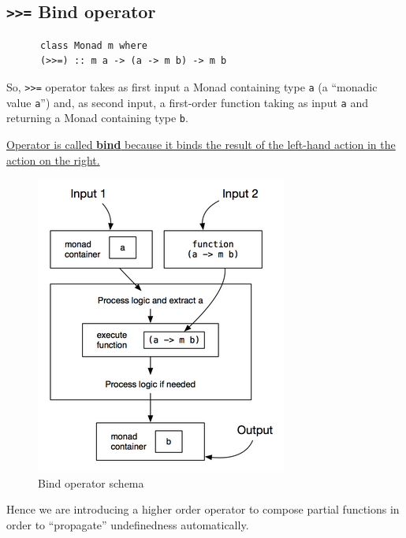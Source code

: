
\newpage
\subsection{\texttt{>>=} Bind operator}

\begin{paracol}{2}
   \colfill
   \begin{lstlisting}
      class Monad m where
      (>>=) :: m a -> (a -> m b) -> m b
   \end{lstlisting}
   
   So, \lstinline|>>=| operator takes as first input a Monad containing type \lstinline|a| (a ``monadic value \lstinline|a|'') and, as second input, a first-order function taking as input \lstinline|a| and returning a Monad containing type \lstinline|b|.

   \ul{Operator is called \textbf{bind} because it binds the result
   of the left-hand action in the action on the right.}
   \colfill

   \switchcolumn
   \begin{figure}[htbp]
      \centering
      \includegraphics{images/monads_bind.png}
      \caption{Bind operator schema}
      \label{fig:monads_bind}
   \end{figure}
\end{paracol}

Hence we are introducing a higher order operator to
compose partial functions in order to
``propagate'' undefinedness automatically.

